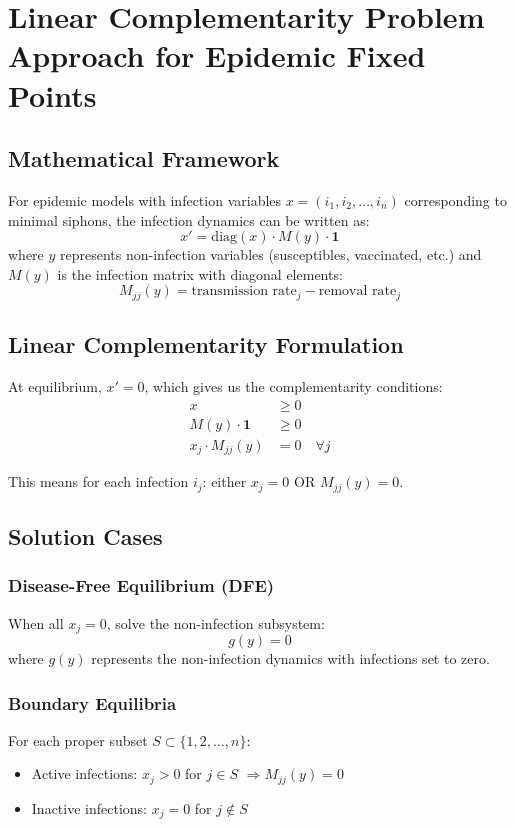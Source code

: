 \section{Linear Complementarity Problem Approach for Epidemic Fixed Points}

\subsection{Mathematical Framework}

For epidemic models with infection variables $x = (i_1, i_2, \ldots, i_n)$ corresponding to minimal siphons, the infection dynamics can be written as:
$$x' = \text{diag}(x) \cdot M(y) \cdot \mathbf{1}$$
where $y$ represents non-infection variables (susceptibles, vaccinated, etc.) and $M(y)$ is the infection matrix with diagonal elements:
$$M_{jj}(y) = \text{transmission rate}_j - \text{removal rate}_j$$

\subsection{Linear Complementarity Formulation}

At equilibrium, $x' = 0$, which gives us the complementarity conditions:
$$\begin{aligned}
x &\geq 0 \\
M(y) \cdot \mathbf{1} &\geq 0 \\
x_j \cdot M_{jj}(y) &= 0 \quad \forall j
\end{aligned}$$

This means for each infection $i_j$: either $x_j = 0$ OR $M_{jj}(y) = 0$.

\subsection{Solution Cases}

\subsubsection{Disease-Free Equilibrium (DFE)}
When all $x_j = 0$, solve the non-infection subsystem:
$$g(y) = 0$$
where $g(y)$ represents the non-infection dynamics with infections set to zero.

\subsubsection{Boundary Equilibria}
For each proper subset $S \subset \{1,2,\ldots,n\}$:
\begin{itemize}
\item Active infections: $x_j > 0$ for $j \in S$ $\Rightarrow M_{jj}(y) = 0$
\item Inactive infections: $x_j = 0$ for $j \notin S$
\end{itemize}

